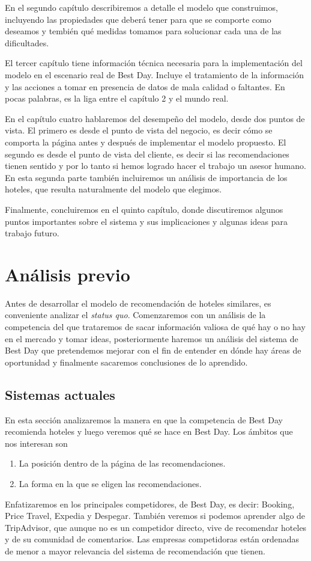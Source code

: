 \documentclass[12pt]{report}
\begin{document}
En el segundo capítulo describiremos a detalle el modelo que construimos, incluyendo las propiedades que deberá tener para que se comporte como deseamos y tembién qué medidas tomamos para solucionar cada una de las dificultades.

El tercer capítulo tiene información técnica necesaria para la implementación del modelo en el escenario real de Best Day. Incluye el tratamiento de la información y las acciones a tomar en presencia de datos de mala calidad o faltantes. En pocas palabras, es la liga entre el capítulo 2 y el mundo real.

En el capítulo cuatro hablaremos del desempeño del modelo, desde dos puntos de vista. El primero es desde el punto de vista del negocio, es decir cómo se comporta la página antes y después de implementar el modelo propuesto. El segundo es desde el punto de vista del cliente, es decir si las recomendaciones tienen sentido y por lo tanto si hemos logrado hacer el trabajo un asesor humano. En esta segunda parte también incluiremos un análisis de importancia de los hoteles, que resulta naturalmente del modelo que elegimos.

Finalmente, concluiremos en el quinto capítulo, donde discutiremos algunos puntos importantes sobre el sistema y sus implicaciones y algunas ideas para trabajo futuro.

\chapter{Análisis previo}

Antes de desarrollar el modelo de recomendación de hoteles similares, es conveniente analizar el \emph{status quo}. Comenzaremos con un análisis de la competencia del que trataremos de sacar información valiosa de qué hay o no hay en el mercado y tomar ideas, posteriormente haremos un análisis del sistema de Best Day que pretendemos mejorar con el fin de entender en dónde hay áreas de oportunidad y finalmente sacaremos conclusiones de lo aprendido.

\section{Sistemas actuales}

En esta sección analizaremos la manera en que la competencia de Best Day recomienda hoteles y luego veremos qué se hace en Best Day. Los ámbitos que nos interesan son
\begin{enumerate}
	\item La posición dentro de la página de las recomendaciones.
	\item La forma en la que se eligen las recomendaciones.
\end{enumerate}
Enfatizaremos en los principales competidores, de Best Day, es decir: Booking, Price Travel, Expedia y Despegar. También veremos si podemos aprender algo de TripAdvisor, que aunque no es un competidor directo, vive de recomendar hoteles y de su comunidad de comentarios. Las empresas competidoras están ordenadas de menor a mayor relevancia del sistema de recomendación que tienen.
\end{document}
